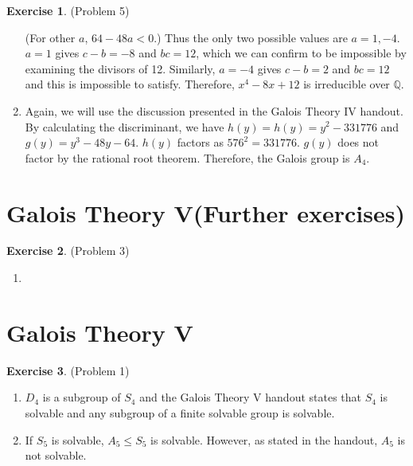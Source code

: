 \documentclass[12pt, psamsfonts]{amsart}
\theoremstyle{definition}
\newtheorem*{exer}{Exercise}
\theoremstyle{remark}
\numberwithin{equation}{section}
\begin{document}
\begin{exer}{(Problem 5)}
\begin{enumerate}[label=(\roman*)]
      (For other $a$, $64 - 48a < 0$.)
      Thus the only two possible values are $a = 1, -4$.
      $a = 1$ gives $c - b = -8$ and $bc = 12$, which we can confirm to be impossible by examining the divisors of 12.
      Similarly, $a = -4$ gives $c - b = 2$ and $bc = 12$ and this is impossible to satisfy.
      Therefore, $x^4 - 8x + 12$ is irreducible over $\mathbb{Q}$.
    \item
      Again, we will use the discussion presented in the Galois Theory IV handout.
      By calculating the discriminant, we have $h(y) = h(y) = y^{2} - 331776$ and $g(y) = y^{3} - 48 y - 64$.
      $h(y)$ factors as $576^2 = 331776$.
      $g(y)$ does not factor by the rational root theorem.
      Therefore, the Galois group is $A_4$.
  \end{enumerate}
\end{exer}

\section{Galois Theory V(Further exercises)}

\begin{exer}{(Problem 3)}
  \begin{enumerate}[label=(\roman*)]
    \item 
  \end{enumerate}
\end{exer}
\section{Galois Theory V}

\begin{exer}{(Problem 1)}
  \begin{enumerate}[label=(\roman*)]
    \item 
      $D_4$ is a subgroup of $S_4$ and the Galois Theory V handout states that $S_4$ is solvable and any subgroup of a finite solvable group is solvable.
    \item
      If $S_5$ is solvable, $A_5 \leq S_5$ is solvable.
      However, as stated in the handout, $A_5$ is not solvable.
  \end{enumerate}
\end{exer}
\end{document}
